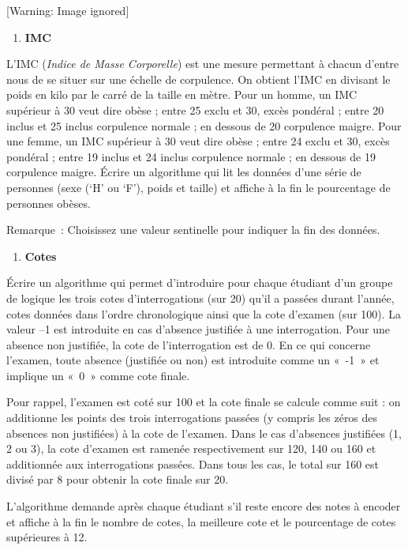 \begin{center}
 [Warning: Image ignored] %

\end{center}
\liststyleExercice
\setcounter{saveenum}{\value{enumi}}
\begin{enumerate}
\setcounter{enumi}{\value{saveenum}}
\item {\sffamily\bfseries
IMC}
\end{enumerate}
{
L’IMC (\textit{Indice de Masse Corporelle}) est une mesure permettant à
chacun d’entre nous de se situer sur une échelle de corpulence. On
obtient l’IMC en divisant le poids en kilo par le carré de la taille en
mètre. Pour un homme, un IMC supérieur à 30 veut dire obèse ; entre 25
exclu et 30, excès pondéral ; entre 20 inclus et 25 inclus corpulence
normale ; en dessous de 20 corpulence maigre. Pour une femme, un IMC
supérieur à 30 veut dire obèse ; entre 24 exclu et 30, excès pondéral ;
entre 19 inclus et 24 inclus corpulence normale ; en dessous de 19
corpulence maigre. Écrire un algorithme qui lit les données d’une série
de personnes (sexe (‘H’ ou ‘F’), poids et taille) et affiche à la fin
le pourcentage de personnes obèses.}

{
Remarque~: Choisissez une valeur sentinelle pour indiquer la fin des
données.}

\liststyleExercice
\setcounter{saveenum}{\value{enumi}}
\begin{enumerate}
\setcounter{enumi}{\value{saveenum}}
\item {\sffamily\bfseries
Cotes}
\end{enumerate}
{
{Écrire} un algorithme qui permet d’introduire
pour chaque étudiant d’un groupe de logique les trois cotes
d’interrogations (sur 20) qu’il a passées durant l’année, cotes données
dans l’ordre chronologique ainsi que la cote d'examen
(sur 100). La valeur –1 est introduite en cas d’absence justifiée à une
interrogation. Pour une absence non justifiée, la cote de
l’interrogation est de 0. En ce qui concerne l'examen,
toute absence (justifiée ou non) est introduite comme un «~-1~» et
implique un «~0~» comme cote finale.}

{
Pour rappel, l’examen est coté sur 100 et la cote finale se calcule
comme suit : on additionne les points des trois interrogations passées
(y compris les zéros des absences non justifiées) à la cote de
l’examen. Dans le cas d’absences justifiées (1, 2 ou 3), la cote
d’examen est ramenée respectivement sur 120, 140 ou 160 et additionnée
aux interrogations passées. Dans tous les cas, le total sur 160 est
divisé par 8 pour obtenir la cote finale sur 20.}

{
L'algorithme demande après chaque étudiant
s'il reste encore des notes à encoder et affiche à la
fin le nombre de cotes, la meilleure cote et le pourcentage de cotes
supérieures à 12.}

